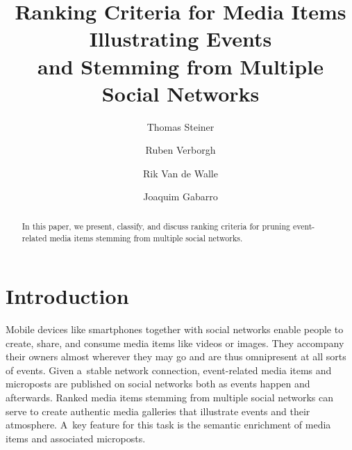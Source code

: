 \documentclass[runningheads,a4paper,11pt]{llncs}
\begin{document}
\mainmatter

\title{Ranking Criteria for Media Items Illustrating Events\\ and Stemming from Multiple Social Networks}

\renewcommand{\ttdefault}{pcr}
\renewcommand\UrlFont{\smaller\tt}

\author{Thomas Steiner \and Ruben Verborgh \and Rik Van de Walle \and Joaquim Gabarro}



\maketitle

\begin{abstract}
In this paper, we present, classify, and discuss ranking criteria for
pruning event-related media items stemming from multiple social networks.
\end{abstract}

\section{Introduction}
Mobile devices like smartphones together with social networks
enable people to create, share, and consume media items
like videos or images.
They accompany their owners almost wherever they may go
and are thus omnipresent at all sorts of events.
Given a~stable network connection, event-related media items and microposts are published
on social networks both as events happen and afterwards.
Ranked media items stemming from multiple social networks
can serve to create authentic media galleries
that illustrate events and their atmosphere.
A~key feature for this task is the semantic enrichment of media items and associated microposts.
\end{document}
